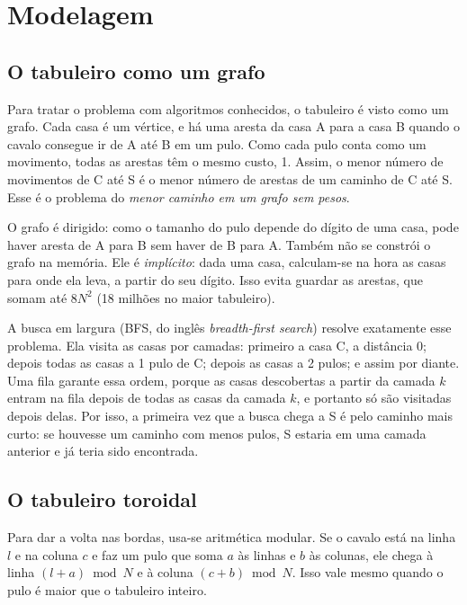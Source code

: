 \section{Modelagem}
\label{sec:modelagem}

\subsection{O tabuleiro como um grafo}
\label{sec:grafo}

Para tratar o problema com algoritmos conhecidos, o tabuleiro é visto como um grafo. Cada
casa é um vértice, e há uma aresta da casa A para a casa B quando o cavalo consegue ir de A
até B em um pulo. Como cada pulo conta como um movimento, todas as arestas têm o mesmo custo,
1. Assim, o menor número de movimentos de C até S é o menor número de arestas de um caminho
de C até S. Esse é o problema do \emph{menor caminho em um grafo sem pesos}.

O grafo é dirigido: como o tamanho do pulo depende do dígito de uma casa, pode haver aresta de
A para B sem haver de B para A. Também não se constrói o grafo na memória. Ele é \emph{implícito}:
dada uma casa, calculam-se na hora as casas para onde ela leva, a partir do seu dígito. Isso
evita guardar as arestas, que somam até $8N^2$ (18 milhões no maior tabuleiro).

A busca em largura (BFS, do inglês \emph{breadth-first search}) resolve exatamente esse
problema. Ela visita as casas por camadas: primeiro a casa C, a distância 0;
depois todas as casas a 1 pulo de C; depois as casas a 2 pulos; e assim por diante. Uma fila
garante essa ordem, porque as casas descobertas a partir da camada $k$ entram na fila depois
de todas as casas da camada $k$, e portanto só são visitadas depois delas. Por isso, a
primeira vez que a busca chega a S é pelo caminho mais curto: se houvesse um caminho com
menos pulos, S estaria em uma camada anterior e já teria sido encontrada.

\subsection{O tabuleiro toroidal}
\label{sec:toro}

Para dar a volta nas bordas, usa-se aritmética modular. Se o cavalo está na linha $l$ e na
coluna $c$ e faz um pulo que soma $a$ às linhas e $b$ às colunas, ele chega à linha
$(l + a) \bmod N$ e à coluna $(c + b) \bmod N$. Isso vale mesmo quando o pulo é maior que o
tabuleiro inteiro.

